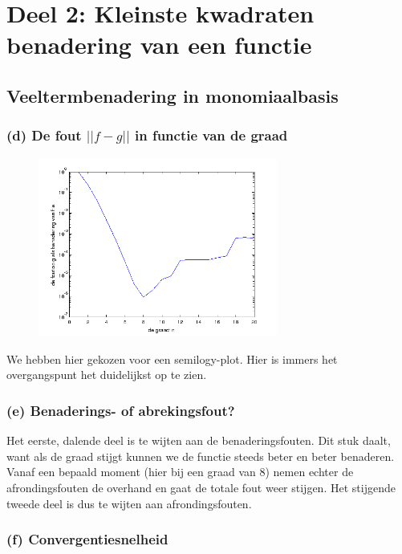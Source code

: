 \documentclass[11pt,a4paper]{article}
\begin{document}
\section{Deel 2: Kleinste kwadraten benadering van een functie}
\subsection{Veeltermbenadering in monomiaalbasis}
\subsubsection*{(d) De fout $||f-g||$ in functie van de graad}

\begin{figure}[H]
	\centering
	\includegraphics[width=0.7\textwidth]{22d1.png}
	\vspace{-10pt}
	\end{figure}
We hebben hier gekozen voor een semilogy-plot. Hier is immers het overgangspunt het duidelijkst op te zien.
\subsubsection*{(e) Benaderings- of abrekingsfout?}

Het eerste, dalende deel is te wijten aan de benaderingsfouten. Dit stuk daalt, want als de graad stijgt kunnen we de functie steeds beter en beter benaderen. Vanaf een bepaald moment (hier bij een graad van 8) nemen echter de afrondingsfouten de overhand en gaat de totale fout weer stijgen. Het stijgende tweede deel is dus te wijten aan afrondingsfouten.

\subsubsection*{(f) Convergentiesnelheid}
\end{document}
